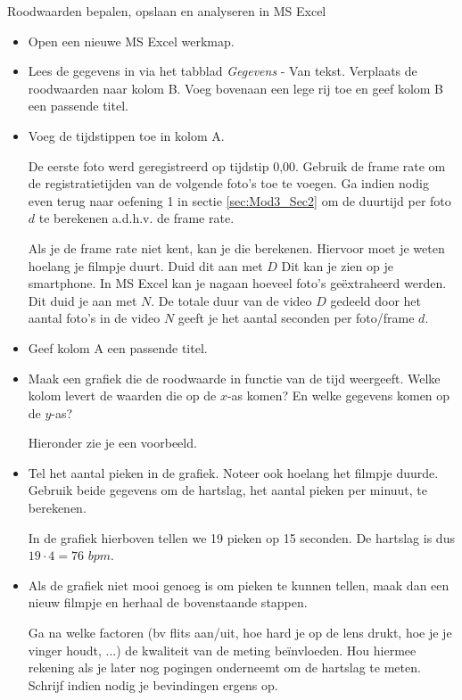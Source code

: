 \begin{opdracht}{Roodwaarden bepalen, opslaan en analyseren in MS Excel}
\begin{enumerate}
	\begin{itemize}
		\item Open een nieuwe MS Excel werkmap.
		\item Lees de gegevens in via het tabblad \emph{Gegevens} - Van tekst. Verplaats de roodwaarden naar kolom B. Voeg bovenaan een lege rij toe en geef kolom B een passende titel.
		\item Voeg de tijdstippen toe in kolom A. 
		
		De eerste foto werd geregistreerd op tijdstip 0,00. Gebruik de frame rate om de registratietijden van de volgende foto's toe te voegen. Ga indien nodig even terug naar oefening 1 in sectie \ref{sec:Mod3_Sec2} om de duurtijd per foto $d$ te berekenen a.d.h.v. de frame rate.
		
		Als je de frame rate niet kent, kan je die berekenen. Hiervoor moet je weten hoelang je filmpje duurt. Duid dit aan met $D$ Dit kan je zien op je smartphone. In MS Excel kan je nagaan hoeveel foto's ge\"extraheerd werden. Dit duid je aan met $N$. De totale duur van de video $D$ gedeeld door het aantal foto's in de video $N$ geeft je het aantal seconden per foto/frame $d$. 
		
		\item Geef kolom A een passende titel.
		
		\item Maak een grafiek die de roodwaarde in functie van de tijd weergeeft. Welke kolom levert de waarden die op de $x$-as komen? En welke gegevens komen op de $y$-as?
		
		Hieronder zie je een voorbeeld.
		
		
		\item Tel het aantal pieken in de grafiek. Noteer ook hoelang het filmpje duurde. Gebruik beide gegevens om de hartslag, het aantal pieken per minuut, te berekenen.
		
		In de grafiek hierboven tellen we 19 pieken op 15 seconden. De hartslag is dus $19 \cdot 4 = 76$ $bpm$.
		
		\item Als de grafiek niet mooi genoeg is om pieken te kunnen tellen, maak dan een nieuw filmpje en herhaal de bovenstaande stappen. 
		
		Ga na welke factoren (bv flits aan/uit, hoe hard je op de lens drukt, hoe je je vinger houdt, ...) de kwaliteit van de meting be\"invloeden. Hou hiermee rekening als je later nog pogingen onderneemt om de hartslag te meten. Schrijf indien nodig je bevindingen ergens op.
	\end{itemize}	

\end{enumerate}
	
\end{opdracht}

